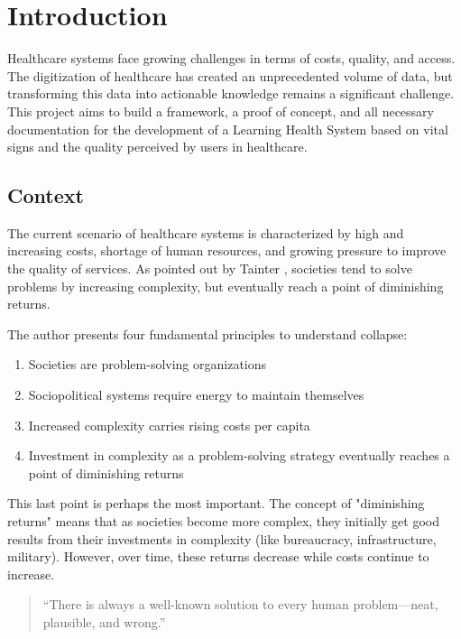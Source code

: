 \chapter{Introduction} \label{chap:intro}

Healthcare systems face growing challenges in terms of costs, quality, and access. The digitization of healthcare has created an unprecedented volume of data, but transforming this data into actionable knowledge remains a significant challenge. This project aims to build a framework, a proof of concept, and all necessary documentation for the development of a Learning Health System based on vital signs and the quality perceived by users in healthcare.

\section{Context} \label{sec:context}

The current scenario of healthcare systems is characterized by high and increasing costs, shortage of human resources, and growing pressure to improve the quality of services. As pointed out by Tainter \cite{Tainter1988}, societies tend to solve problems by increasing complexity, but eventually reach a point of diminishing returns.

The author presents four fundamental principles to understand collapse:
\begin{enumerate}
\item Societies are problem-solving organizations
\item Sociopolitical systems require energy to maintain themselves
\item Increased complexity carries rising costs per capita
\item Investment in complexity as a problem-solving strategy eventually reaches a point of diminishing returns
\end{enumerate}

This last point is perhaps the most important. The concept of "diminishing returns" means that as societies become more complex, they initially get good results from their investments in complexity (like bureaucracy, infrastructure, military). However, over time, these returns decrease while costs continue to increase.

\begin{quote}
``There is always a well-known solution to every human problem—neat, plausible, and wrong.'' \cite{Mencken1920}
\end{quote}


